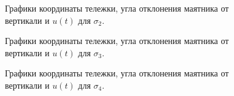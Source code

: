 \begin{figure}[!h]
\caption{Графики координаты тележки, угла отклонения маятника от вертикали и $u(t)$ для $\sigma_2$.}
\label{3_x_nlin_s2}
\end{figure}

\begin{figure}[!h]
\caption{Графики координаты тележки, угла отклонения маятника от вертикали и $u(t)$ для $\sigma_3$.}
\label{3_x_nlin_s3}
\end{figure}

\begin{figure}[!h]
\caption{Графики координаты тележки, угла отклонения маятника от вертикали и $u(t)$ для $\sigma_4$.}
\label{3_x_nlin_s4}
\end{figure}

